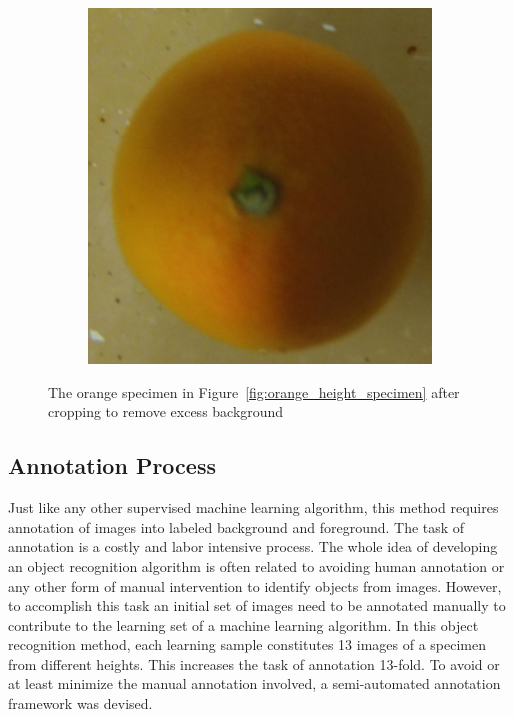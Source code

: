 \documentclass {udthesis}
\begin{document}
\begin{figure}
\begin{subfigure}[]{0.12\textwidth}
      \caption{}
  \end{subfigure}
  \begin{subfigure}[]{0.12\textwidth}
      \includegraphics[width=\textwidth]{orange4_obj_11/orange4_011_08}
      \caption{}
  \end{subfigure}
\caption[Images of an orange specimen after cropping excess background]{The orange specimen in Figure~\ref{fig:orange_height_specimen} after cropping to remove excess background}
\label{fig:orange_height_specimen_cropped}
\end{figure}	


\subsection{Annotation Process}
\label{sec:distdes_annotation}

Just like any other supervised machine learning algorithm, this method requires annotation of images into labeled background and foreground. The task of annotation is a costly and labor intensive process. The whole idea of developing an object recognition algorithm is often related to avoiding human annotation or any other form of manual intervention to identify objects from images. However, to accomplish this task an initial set of images need to be annotated manually to contribute to the learning set of a machine learning algorithm. In this object recognition method, each learning sample constitutes 13 images of a specimen from different heights. This increases the task of annotation 13-fold. To avoid or at least minimize the manual annotation involved, a semi-automated annotation framework was devised.
\end{document}
